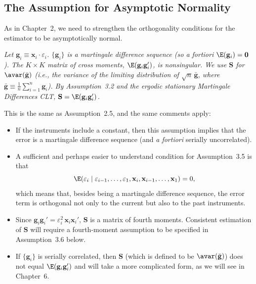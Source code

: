 \subsection*{The Assumption for Asymptotic Normality}

As in Chapter~2, we need to strengthen the orthogonality conditions for the estimator
to be asymptotically normal.

\begin{assumption}
\label{ass:3.5}
\emph{Let $\mathbf{g}_i \equiv \mathbf{x}_i \cdot \varepsilon_i$.
$\{\mathbf{g}_i\}$ is a martingale difference sequence (so a fortiori
$\E(\mathbf{g}_i) = \mathbf{0}$).  The $K \times K$ matrix of cross moments,
$\E(\mathbf{g}_i \mathbf{g}_i')$, is nonsingular.
We use $\mathbf{S}$ for $\avar(\bar{\mathbf{g}})$ (i.e., the variance of the limiting distribution
of $\sqrt{n}\,\bar{\mathbf{g}}$, where
$\bar{\mathbf{g}} \equiv \frac{1}{n} \sum_{i=1}^{n} \mathbf{g}_i$).
By Assumption~3.2 and the ergodic stationary Martingale Differences CLT,
$\mathbf{S} = \E(\mathbf{g}_i \mathbf{g}_i')$.}
\end{assumption}

This is the same as Assumption~2.5, and the same comments apply:
\begin{itemize}
\item If the instruments include a constant, then this assumption implies that the error
  is a martingale difference sequence (and \emph{a fortiori} serially uncorrelated).

\item A sufficient and perhaps easier to understand condition for Assumption~3.5 is
  that
  \begin{equation}
    \E(\varepsilon_i \mid \varepsilon_{i-1}, \ldots, \varepsilon_1,
    \mathbf{x}_i, \mathbf{x}_{i-1}, \ldots, \mathbf{x}_1) = 0,
    \label{eq:3.3.6}
  \end{equation}
  which means that, besides being a martingale difference sequence, the error term
  is orthogonal not only to the current but also to the past instruments.

\item Since $\mathbf{g}_i \mathbf{g}_i' = \varepsilon_i^2\, \mathbf{x}_i \mathbf{x}_i'$,
  $\mathbf{S}$ is a matrix of fourth moments.  Consistent estimation of $\mathbf{S}$ will require a
  fourth-moment assumption to be specified in Assumption~3.6 below.

\item If $\{\mathbf{g}_i\}$ is serially correlated, then $\mathbf{S}$ (which is defined to be
  $\avar(\bar{\mathbf{g}})$) does not equal $\E(\mathbf{g}_i \mathbf{g}_i')$ and will take a more
  complicated form, as we will see in Chapter~6.
\end{itemize}

